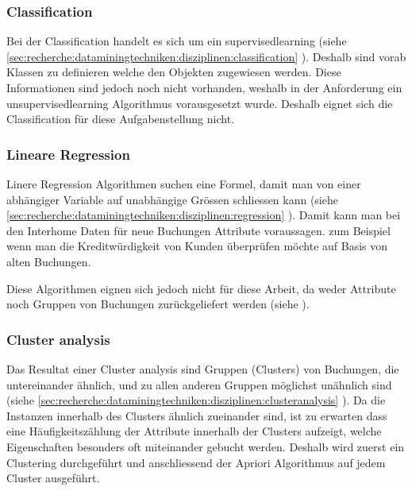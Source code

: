 \subsubsection{Classification}
\label{sec:konzept:disziplinauswahl:classification}
Bei der Classification handelt es sich um ein \gls{supervisedlearning} (siehe \cref{sec:recherche:dataminingtechniken:disziplinen:classification} ). Deshalb sind vorab Klassen zu definieren welche den Objekten zugewiesen werden. Diese Informationen sind jedoch noch nicht vorhanden, weshalb in der Anforderung  ein \gls{unsupervisedlearning} Algorithmus vorausgesetzt wurde. Deshalb eignet sich die Classification für diese Aufgabenstellung nicht.

\subsubsection{Lineare Regression}
\label{sec:konzept:disziplinauswahl:regression}
Linere Regression Algorithmen suchen eine Formel, damit man von einer abhängiger Variable auf unabhängige Grössen schliessen kann (siehe \cref{sec:recherche:dataminingtechniken:disziplinen:regression} ). Damit kann man bei den Interhome Daten für neue Buchungen Attribute voraussagen. zum Beispiel wenn man die Kreditwürdigkeit von Kunden überprüfen möchte auf Basis von alten Buchungen.

Diese Algorithmen eignen sich jedoch nicht für diese Arbeit, da weder Attribute noch Gruppen von Buchungen zurückgeliefert werden (siehe  ).

\subsubsection{Cluster analysis}
\label{sec:konzept:disziplinauswahl:clusteranalysis}
Das Resultat einer Cluster analysis sind Gruppen (Clusters) von Buchungen, die untereinander ähnlich, und zu allen anderen Gruppen möglichst unähnlich sind (siehe \cref{sec:recherche:dataminingtechniken:disziplinen:clusteranalysis} ). Da die Instanzen innerhalb des Clusters ähnlich zueinander sind, ist zu erwarten dass eine Häufigkeitszählung der Attribute innerhalb der Clusters aufzeigt, welche Eigenschaften besonders oft miteinander gebucht werden. Deshalb wird zuerst ein Clustering durchgeführt und anschliessend der Apriori Algorithmus auf jedem Cluster ausgeführt. 

